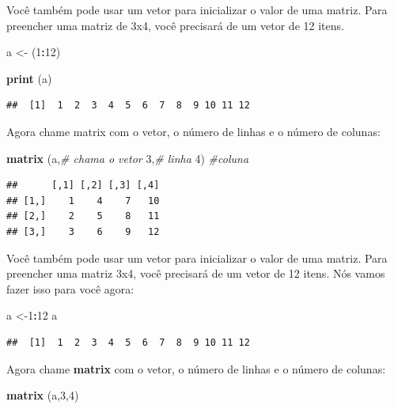 \documentclass[]{book}
\newenvironment{Shaded}{\begin{snugshade}}{\end{snugshade}}
\newcommand{\CommentTok}[1]{\textcolor[rgb]{0.56,0.35,0.01}{\textit{#1}}}
\newcommand{\DecValTok}[1]{\textcolor[rgb]{0.00,0.00,0.81}{#1}}
\newcommand{\KeywordTok}[1]{\textcolor[rgb]{0.13,0.29,0.53}{\textbf{#1}}}
\newcommand{\NormalTok}[1]{#1}
\newcommand{\OperatorTok}[1]{\textcolor[rgb]{0.81,0.36,0.00}{\textbf{#1}}}
\newcommand{\StringTok}[1]{\textcolor[rgb]{0.31,0.60,0.02}{#1}}
\begin{document}
Você também pode usar um vetor para inicializar o valor de uma matriz. Para preencher uma matriz de 3x4, você precisará de um vetor de 12 itens.

\begin{Shaded}
\begin{Highlighting}[]
\NormalTok{a <-}\StringTok{ }\NormalTok{(}\DecValTok{1}\OperatorTok{:}\DecValTok{12}\NormalTok{)}

\KeywordTok{print}\NormalTok{ (a)}
\end{Highlighting}
\end{Shaded}

\begin{verbatim}
##  [1]  1  2  3  4  5  6  7  8  9 10 11 12
\end{verbatim}

Agora chame matrix com o vetor, o número de linhas e o número de colunas:

\begin{Shaded}
\begin{Highlighting}[]
\KeywordTok{matrix}\NormalTok{ (a,}\CommentTok{# chama o vetor}
        \DecValTok{3}\NormalTok{,}\CommentTok{# linha}
        \DecValTok{4}\NormalTok{) }\CommentTok{#coluna}
\end{Highlighting}
\end{Shaded}

\begin{verbatim}
##      [,1] [,2] [,3] [,4]
## [1,]    1    4    7   10
## [2,]    2    5    8   11
## [3,]    3    6    9   12
\end{verbatim}

Você também pode usar um vetor para inicializar o valor de uma matriz. Para preencher uma matriz 3x4, você precisará de um vetor de 12 itens. Nós vamos fazer isso para você agora:

\begin{Shaded}
\begin{Highlighting}[]
\NormalTok{a <-}\DecValTok{1}\OperatorTok{:}\DecValTok{12}
\NormalTok{a}
\end{Highlighting}
\end{Shaded}

\begin{verbatim}
##  [1]  1  2  3  4  5  6  7  8  9 10 11 12
\end{verbatim}

Agora chame \textbf{matrix} com o vetor, o número de linhas e o número de colunas:

\begin{Shaded}
\begin{Highlighting}[]
\KeywordTok{matrix}\NormalTok{ (a,}\DecValTok{3}\NormalTok{,}\DecValTok{4}\NormalTok{)}
\end{Highlighting}
\end{Shaded}
\end{document}
